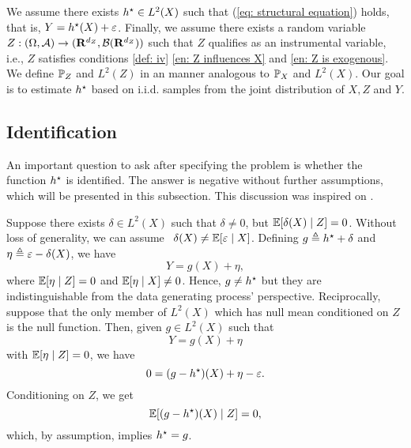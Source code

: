 We assume there exists $ h^{ \star } \in L^{ 2 } ( X ) $ such that (\ref{eq: structural equation}) holds, that is, $ Y = h^{ \star } ( X ) + \varepsilon $.
Finally, we assume there exists a random variable $ Z : ( \Omega, \mathcal{A} ) \to ( \mathbf{R}^{ d_{ Z } }, \mathcal{B} ( \mathbf{R}^{ d_{ Z } } ) ) $ such that $ Z $ qualifies as an instrumental variable, i.e., $ Z $ satisfies conditions \ref{def: iv} \ref{en: Z influences X} and \ref{en: Z is exogenous}.
We define $ \mathbb{P}_{ Z } $ and $ L^{ 2 } ( Z ) $ in an manner analogous to $ \mathbb{P}_{ X } $ and $ L^{ 2 } ( X ) $.
Our goal is to estimate $ h^{ \star } $ based on i.i.d. samples from the joint distribution of $ X, Z $ and $ Y $.

\subsection{Identification}
\label{sec: identification}

An important question to ask after specifying the problem is whether the function $ h^{ \star } $ is identified.
The answer is negative without further assumptions, which will be presented in this subsection.
This discussion was inspired on \cite[Section~2]{newey2003}.

Suppose there exists $ \delta \in L^{ 2 } ( X ) $ such that $ \delta \neq 0 $, but $ \mathbb{E} [ \delta ( X ) \mid Z ] = 0 $.
Without loss of generality, we can assume\footnotemark~ $ \delta ( X ) \neq \mathbb{E} [ \varepsilon \mid X ] $.
Defining $ g \triangleq h^{ \star } + \delta $ and $ \eta \triangleq \varepsilon - \delta ( X ) $, we have
\begin{equation*}
    Y = g ( X ) + \eta
,\end{equation*}
where $ \mathbb{E} [ \eta \mid Z ] = 0 $ and $ \mathbb{E} [ \eta \mid X ] \neq 0 $.
Hence, $ g \neq h^{ \star } $ but they are indistinguishable from the data generating process' perspective.
Reciprocally, suppose that the only member of $ L^{ 2 } ( X ) $ which has null mean conditioned on $ Z $ is the null function.
Then, given $ g \in L^{ 2 } ( X ) $ such that
\begin{equation*}
    Y = g ( X ) + \eta
\end{equation*}
with $ \mathbb{E} [ \eta \mid Z ] = 0 $, we have
\begin{equation*}
    0 = ( g - h^{ \star } ) ( X ) + \eta - \varepsilon
.\end{equation*}
Conditioning on $ Z $, we get
\begin{equation*}
    \mathbb{E} [ ( g - h^{ \star } ) ( X ) \mid Z ] = 0
,\end{equation*}
which, by assumption, implies $ h^{ \star } = g $.

